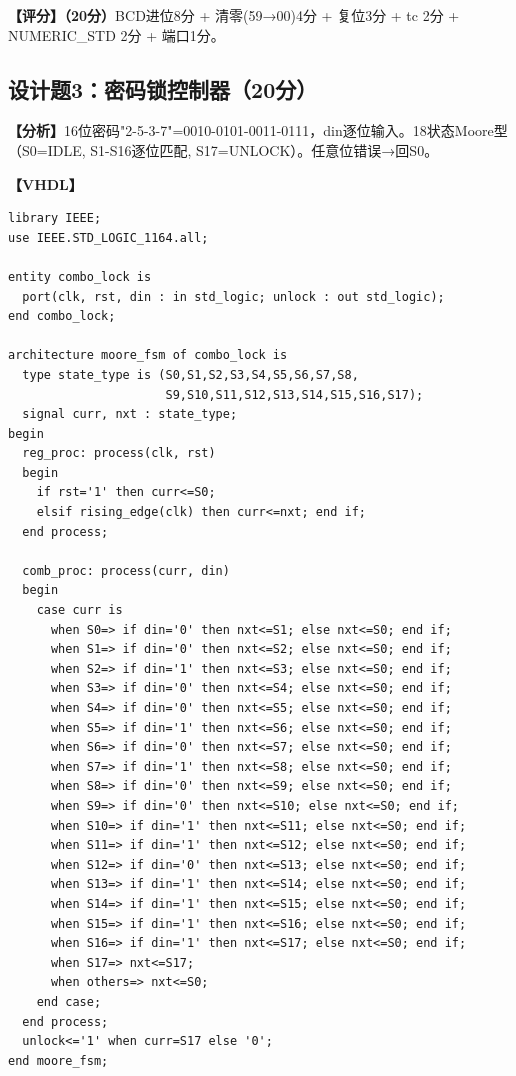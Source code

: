 \textbf{【评分】（20分）}BCD进位8分 + 清零(59→00)4分 + 复位3分 + tc 2分 + NUMERIC\_STD 2分 + 端口1分。

\subsection{设计题3：密码锁控制器（20分）}

\textbf{【分析】}16位密码"2-5-3-7"=0010-0101-0011-0111，din逐位输入。18状态Moore型（S0=IDLE, S1-S16逐位匹配, S17=UNLOCK）。任意位错误→回S0。

\textbf{【VHDL】}
\begin{lstlisting}
library IEEE;
use IEEE.STD_LOGIC_1164.all;

entity combo_lock is
  port(clk, rst, din : in std_logic; unlock : out std_logic);
end combo_lock;

architecture moore_fsm of combo_lock is
  type state_type is (S0,S1,S2,S3,S4,S5,S6,S7,S8,
                      S9,S10,S11,S12,S13,S14,S15,S16,S17);
  signal curr, nxt : state_type;
begin
  reg_proc: process(clk, rst)
  begin
    if rst='1' then curr<=S0;
    elsif rising_edge(clk) then curr<=nxt; end if;
  end process;

  comb_proc: process(curr, din)
  begin
    case curr is
      when S0=> if din='0' then nxt<=S1; else nxt<=S0; end if;
      when S1=> if din='0' then nxt<=S2; else nxt<=S0; end if;
      when S2=> if din='1' then nxt<=S3; else nxt<=S0; end if;
      when S3=> if din='0' then nxt<=S4; else nxt<=S0; end if;
      when S4=> if din='0' then nxt<=S5; else nxt<=S0; end if;
      when S5=> if din='1' then nxt<=S6; else nxt<=S0; end if;
      when S6=> if din='0' then nxt<=S7; else nxt<=S0; end if;
      when S7=> if din='1' then nxt<=S8; else nxt<=S0; end if;
      when S8=> if din='0' then nxt<=S9; else nxt<=S0; end if;
      when S9=> if din='0' then nxt<=S10; else nxt<=S0; end if;
      when S10=> if din='1' then nxt<=S11; else nxt<=S0; end if;
      when S11=> if din='1' then nxt<=S12; else nxt<=S0; end if;
      when S12=> if din='0' then nxt<=S13; else nxt<=S0; end if;
      when S13=> if din='1' then nxt<=S14; else nxt<=S0; end if;
      when S14=> if din='1' then nxt<=S15; else nxt<=S0; end if;
      when S15=> if din='1' then nxt<=S16; else nxt<=S0; end if;
      when S16=> if din='1' then nxt<=S17; else nxt<=S0; end if;
      when S17=> nxt<=S17;
      when others=> nxt<=S0;
    end case;
  end process;
  unlock<='1' when curr=S17 else '0';
end moore_fsm;
\end{lstlisting}

